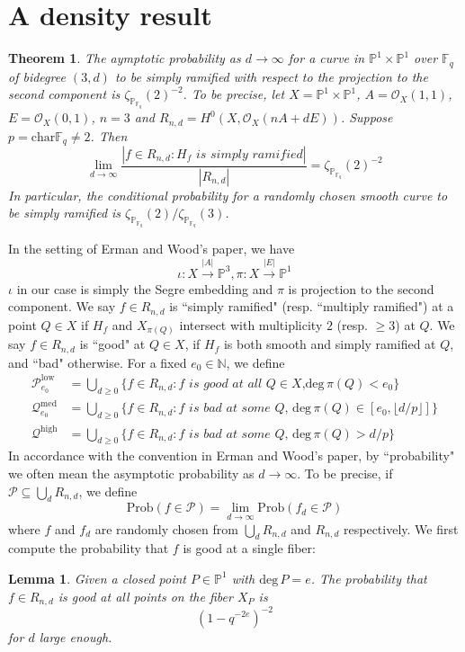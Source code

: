 \documentclass[12pt]{article}
\theoremstyle{plain}
\newtheorem{theorem}[equation]{Theorem}
\newtheorem{lemma}[equation]{Lemma}
\theoremstyle{definition}
\newcommand{\IN}{\mathbb{N}}
\newcommand{\IF}{\mathbb{F}}
\newcommand{\IP}{\mathbb{P}}
\newcommand{\sO}{\mathcal{O}}
\newcommand{\sP}{\mathcal{P}}
\newcommand{\sQ}{\mathcal{Q}}
\renewcommand{\deg}{\mathrm{deg}\,}
\newcommand\union{\bigcup}
\newcommand{\<}{\langle}
\renewcommand{\>}{\rangle}
\newcommand{\Prob}{\mathrm{Prob}}
\begin{document}
\section{A density result}
\begin{theorem}
The aymptotic probability as $d \to \infty$ for a curve in $\IP^1 \times \IP^1$ over $\IF_q$ of bidegree $(3, d)$ to be simply ramified with respect to the projection to the second component is $\zeta_{\IP_{\IF_q}}(2)^{-2}$. To be precise, let $X = \IP^1 \times \IP^1$, $A = \sO_X(1, 1)$, $E = \sO_X(0, 1)$, $n = 3$ and $R_{n,d} = H^0(X, \sO_X(nA + d E))$. Suppose $p = \mathrm{char } \IF_q \neq 2$. Then 
$$\lim_{d \to \infty} \frac{|f \in R_{n, d} : H_f \textit{ is simply ramified}|}{|R_{n,d}|} = \zeta_{\IP_{\IF_q}}(2)^{-2} $$ In particular, the conditional probability for a randomly chosen smooth curve to be simply ramified is $\zeta_{\IP_{\IF_q}}(2)/\zeta_{\IP_{\IF_q}}(3)$. 
\end{theorem}
In the setting of Erman and Wood's paper, we have $$\iota : X \stackrel{|A|}{\to} \IP^3, \pi : X \stackrel{|E|}{\to} \IP^1$$ $\iota$ in our case is simply the Segre embedding and $\pi$ is projection to the second component. We say $f \in R_{n, d}$ is ``simply ramified" (resp. ``multiply ramified") at a point $Q \in X$ if $H_f$ and $X_{\pi(Q)}$ intersect with multiplicity $2$ (resp. $\ge 3$) at $Q$. We say $f \in R_{n, d}$ is ``good" at $Q \in X$, if $H_f$ is both smooth and simply ramified at $Q$, and ``bad" otherwise. For a fixed $e_0 \in \IN$, we define 
\begin{align*}
\sP_{e_0}^{\mathrm{low}} &= \union_{d \ge 0} \{ f \in R_{n, d} : f \textit{ is good at all $Q \in X$,}\deg \pi(Q) < e_0\}\\
\sQ_{e_0}^{\mathrm{med}} &= \union_{d \ge 0} \{f \in R_{n, d} : f \textit{ is bad at some $Q$, }\deg \pi(Q) \in [e_0, \lfloor d/p \rfloor]\}\\
\sQ^{\mathrm{high}} &= \union_{d \ge 0} \{f \in R_{n, d} : f \textit{ is bad at some $Q$, }\deg \pi(Q) > d/p\}
\end{align*}
In accordance with the convention in Erman and Wood's paper, by ``probability" we often mean the asymptotic probability as $d \to \infty$. To be precise, if $\sP \subseteq \union_d R_{n, d}$, we define 
$$ \Prob(f \in \sP) = \lim_{d \to \infty}\Prob(f_d \in \sP) $$
where $f$ and $f_d$ are randomly chosen from $\union_{d} R_{n, d}$ and $R_{n, d}$ respectively. We first compute the probability that $f$ is good at a single fiber:
\begin{lemma} 
\label{count}
Given a closed point $P \in \IP^1$ with $\deg P = e$. The probability that $f \in R_{n, d}$ is good at all points on the fiber $X_P$ is 
$$ ( 1 - q^{- 2e})^{-2} $$ for $d$ large enough. 
\end{lemma}
\end{document}

